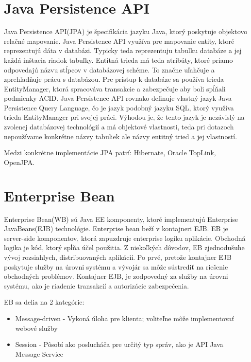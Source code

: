 \section{Java Persistence API}
Java Persistence API(JPA) je špecifikácia jazyku Java, ktorý poskytuje objektovo relačné mapovanie. Java Persistence API využíva pre mapovanie entity, ktoré reprezentujú dáta v databázi. Typicky teda reprezentuju tabuľku databáze a jej každá inštacia riadok tabuľky. Entitná trieda má teda atribúty, ktoré priamo odpovedajú názvu stĺpcov v databázovej schéme. To značne uľahčuje a zprehľadňuje prácu s databázou. Pre prístup k databáze sa používa trieda EntityManager, ktorá spracováva transakcie a zabezpečuje aby boli spĺňali podmienky ACID. Java Persistence API rovnako definuje vlastný jazyk Java Persistence Query Language, čo je jazyk podobný jazyku SQL, ktorý využíva trieda EntityManager pri svojej práci. Výhodou je, že tento jazyk je nezávislý na zvolenej databázovej technológií a má objektové vlastnosti, teda pri dotazoch nepoužívame konkrétne názvy tabuliek ale názvy entitný tried a jej vlastností. 

Medzi konkrétne implementácie JPA patrí: Hibernate, Oracle TopLink, OpenJPA.

\section{Enterprise Bean}
Enterprise Bean(WB) sú Java EE komponenty, ktoré implementujú Enterprise JavaBeans(EJB) technológie. Enterprise bean beží v kontajneri EJB. EB je server-side komponentov, ktorá zapuzdruje enterprise logiku aplikácie. Obchodná logika je kód, ktorý spĺňa účel použitia. Z niekoľkých dôvodov, EB zjednodušuhe vývoj rozsiahlych, distribuovaných aplikácií. Po prvé, pretože kontajner EJB poskytuje služby na úrovni systému a vývojár sa môže sústrediť na riešenie obchodných problémov. Kontajner EJB, je zodpovedný za služby na úrovni systému, ako je riadenie transakcií a autorizácie zabezpečenia.


EB sa delia na 2 kategórie:
\begin{itemize}
\item Message-driven - Vykoná úloha pre klienta; voliteľne môže implementovať webové služby
\item Session - Pôsobí ako poslucháča pre určitý typ správ, ako je API Java Message Service

\end{itemize}






